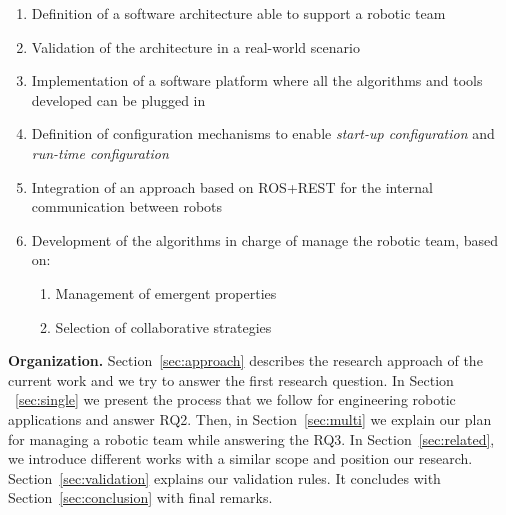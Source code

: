 \begin{enumerate}
\item Definition of a software architecture able to support a robotic team
\item Validation of the architecture in a real-world scenario
\item Implementation of a software platform where all the algorithms and tools developed can be plugged in 
\item Definition of configuration mechanisms to enable \emph{start-up configuration} and \emph{run-time configuration}
\item Integration of an approach based on ROS+REST for the internal communication between robots
\item Development of the algorithms in charge of manage the robotic team, based on:
\begin{enumerate}
\item Management of emergent properties
\item Selection of collaborative strategies
\end{enumerate}
\end{enumerate}

\textbf{Organization.} 
Section~\ref{sec:approach} describes the research approach of the current work and we try to answer the first research question.
In Section ~\ref{sec:single} we present the process that we follow for engineering robotic applications and answer RQ2.
Then, in Section~\ref{sec:multi} we explain our plan for managing a robotic team while answering the RQ3.
In Section~\ref{sec:related}, we introduce different works with a similar scope and position our research.
Section~\ref{sec:validation} explains our validation rules.
It concludes with Section~\ref{sec:conclusion} with final remarks.